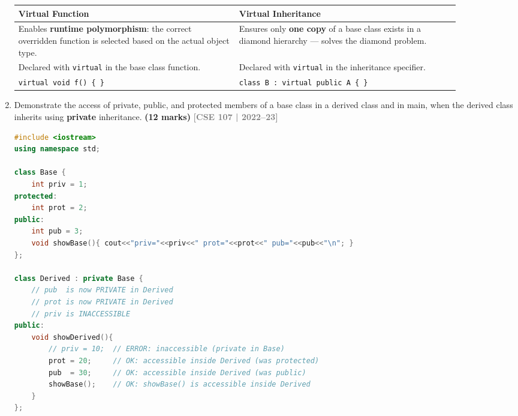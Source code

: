 \documentclass[12pt,a3paper]{article}
\newcommand{\yr}[1]{\hfill\textcolor{gray}{\small\textbf{[#1]}}}
\newcommand{\mk}[1]{\textcolor{orange!70!black}{\small\textbf{(#1 marks)}}}
\begin{document}
\begin{enumerate}
\begin{tcolorbox}
\begin{center}
\small
\begin{tabular}{@{}p{0.44\linewidth}p{0.44\linewidth}@{}}
\toprule
\textbf{Virtual Function} & \textbf{Virtual Inheritance} \\
\midrule
Enables \textbf{runtime polymorphism}: the correct overridden
function is selected based on the actual object type. &
Ensures only \textbf{one copy} of a base class exists in a
diamond hierarchy --- solves the diamond problem. \\[3pt]
Declared with \texttt{virtual} in the base class function. &
Declared with \texttt{virtual} in the inheritance specifier. \\[3pt]
\texttt{virtual void f() \{ \}} &
\texttt{class B : virtual public A \{ \}} \\
\bottomrule
\end{tabular}
\end{center}

\end{tcolorbox}


\item Demonstrate the access of private, public, and protected members of a base class in a derived class and in main, when the derived class inherits using \textbf{private} inheritance. \mk{12}
\yr{CSE 107 | 2022--23}
\begin{tcolorbox}[enhanced,breakable,ansbox,colback=cG!4,colframe=cG,
  boxrule=0.8pt,arc=5pt,
  title={\textbf{Answer --- Private inheritance --- access demo in derived and main}},
  fonttitle=\bfseries\color{white},colbacktitle=cG]

\begin{lstlisting}[language=C++]
#include <iostream>
using namespace std;

class Base {
    int priv = 1;
protected:
    int prot = 2;
public:
    int pub = 3;
    void showBase(){ cout<<"priv="<<priv<<" prot="<<prot<<" pub="<<pub<<"\n"; }
};

class Derived : private Base {
    // pub  is now PRIVATE in Derived
    // prot is now PRIVATE in Derived
    // priv is INACCESSIBLE
public:
    void showDerived(){
        // priv = 10;  // ERROR: inaccessible (private in Base)
        prot = 20;     // OK: accessible inside Derived (was protected)
        pub  = 30;     // OK: accessible inside Derived (was public)
        showBase();    // OK: showBase() is accessible inside Derived
    }
};


\end{lstlisting}
\end{tcolorbox}
\end{enumerate}
\end{document}
